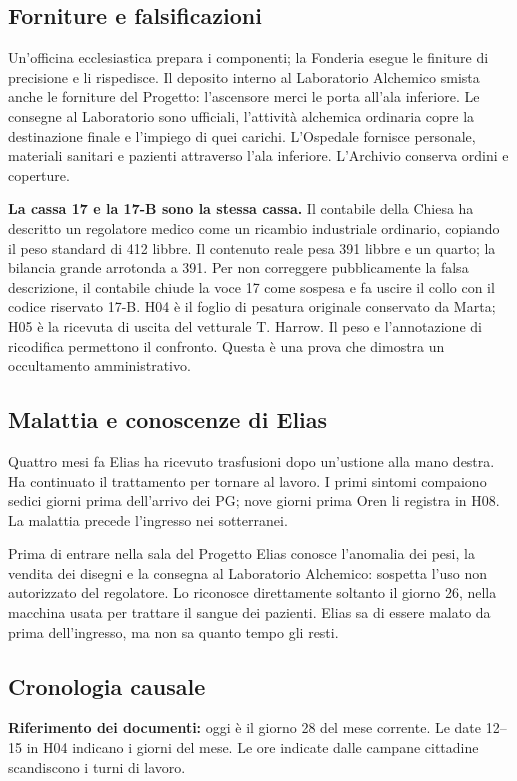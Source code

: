 \documentclass[11pt,a4paper]{article}
\begin{document}
\subsection{Forniture e falsificazioni}
Un'officina ecclesiastica prepara i componenti; la Fonderia esegue le finiture di precisione e li rispedisce. Il deposito interno al Laboratorio Alchemico smista anche le forniture del Progetto: l'ascensore merci le porta all'ala inferiore. Le consegne al Laboratorio sono ufficiali, l'attività alchemica ordinaria copre la destinazione finale e l'impiego di quei carichi. L'Ospedale fornisce personale, materiali sanitari e pazienti attraverso l'ala inferiore. L'Archivio conserva ordini e coperture.

\textbf{La cassa 17 e la 17-B sono la stessa cassa.} Il contabile della Chiesa ha descritto un regolatore medico come un ricambio industriale ordinario, copiando il peso standard di 412 libbre. Il contenuto reale pesa 391 libbre e un quarto; la bilancia grande arrotonda a 391. Per non correggere pubblicamente la falsa descrizione, il contabile chiude la voce 17 come sospesa e fa uscire il collo con il codice riservato 17-B. H04 è il foglio di pesatura originale conservato da Marta; H05 è la ricevuta di uscita del vetturale T. Harrow. Il peso e l'annotazione di ricodifica permettono il confronto. Questa è una prova che dimostra un occultamento amministrativo.

\subsection{Malattia e conoscenze di Elias}
Quattro mesi fa Elias ha ricevuto trasfusioni dopo un'ustione alla mano destra. Ha continuato il trattamento per tornare al lavoro. I primi sintomi compaiono sedici giorni prima dell'arrivo dei PG; nove giorni prima Oren li registra in H08. La malattia precede l'ingresso nei sotterranei.

Prima di entrare nella sala del Progetto Elias conosce l'anomalia dei pesi, la vendita dei disegni e la consegna al Laboratorio Alchemico: sospetta l'uso non autorizzato del regolatore. Lo riconosce direttamente soltanto il giorno 26, nella macchina usata per trattare il sangue dei pazienti. Elias sa di essere malato da prima dell'ingresso, ma non sa quanto tempo gli resti.

\subsection{Cronologia causale}
\textbf{Riferimento dei documenti:} oggi è il giorno 28 del mese corrente. Le date 12--15 in H04 indicano i giorni del mese. Le ore indicate dalle campane cittadine scandiscono i turni di lavoro.
\end{document}
